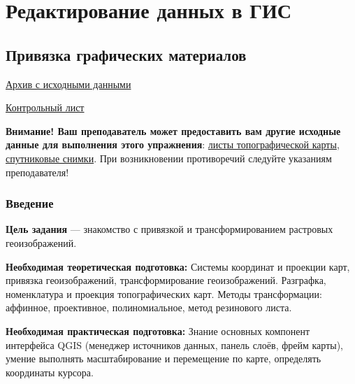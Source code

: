 \documentclass[
  12pt,
]{book}
\begin{document}
\hypertarget{part-ux440ux435ux434ux430ux43aux442ux438ux440ux43eux432ux430ux43dux438ux435-ux434ux430ux43dux43dux44bux445-ux432-ux433ux438ux441}{%
\part{Редактирование данных в ГИС}\label{part-ux440ux435ux434ux430ux43aux442ux438ux440ux43eux432ux430ux43dux438ux435-ux434ux430ux43dux43dux44bux445-ux432-ux433ux438ux441}}

\hypertarget{raster-reference}{%
\chapter{Привязка графических материалов}\label{raster-reference}}

\href{https://github.com/aentin/qgis-course/raw/master/files/Ex05.zip}{Архив с исходными данными}

\href{https://github.com/aentin/qgis-course/raw/master/files/Ex05_\%D0\%BE\%D1\%82\%D1\%87\%D1\%91\%D1\%82.docx}{Контрольный лист}

\textbf{Внимание! Ваш преподаватель может предоставить вам другие исходные данные для выполнения этого упражнения}: \href{https://drive.google.com/drive/folders/1-NtO7MSvw7uX3O3pzXaxT8Z2qvGk1PJM?usp=sharing}{листы топографической карты}, \href{https://drive.google.com/drive/folders/1-PNy4EK3vydNuTYxAqBZe-MEFqQdYPUx?usp=sharing}{спутниковые снимки}. При возникновении противоречий следуйте указаниям преподавателя!

\hypertarget{raster-reference-intro}{%
\section{Введение}\label{raster-reference-intro}}

\textbf{Цель задания} --- знакомство с привязкой и трансформированием растровых геоизображений.

\textbf{Необходимая теоретическая подготовка:} Системы координат и проекции карт, привязка геоизображений, трансформирование геоизображений. Разграфка, номенклатура и проекция топографических карт. Методы трансформации: аффинное, проективное, полиномиальное, метод резинового листа.

\textbf{Необходимая практическая подготовка:} Знание основных компонент интерфейса QGIS (менеджер источников данных, панель слоёв, фрейм карты), умение выполнять масштабирование и перемещение по карте, определять координаты курсора.
\end{document}
